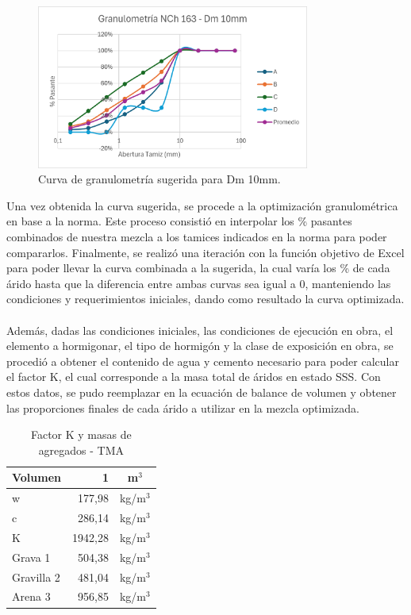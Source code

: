 \begin{figure}[H]
    \centering
    \includegraphics[width=0.8\textwidth]{GRAFICOS/NCh163.png}
    \caption{Curva de granulometría sugerida para Dm 10mm.}
\end{figure}

Una vez obtenida la curva sugerida, se procede a la optimización granulométrica en base a la norma. Este proceso consistió en interpolar los \% pasantes combinados de nuestra mezcla a los tamices indicados en la norma para poder compararlos. Finalmente, se realizó una iteración con la función objetivo de Excel para poder llevar la curva combinada a la sugerida, la cual varía los \% de cada árido hasta que la diferencia entre ambas curvas sea igual a 0, manteniendo las condiciones y requerimientos iniciales, dando como resultado la curva optimizada.
\\\\
Además, dadas las condiciones iniciales, las condiciones de ejecución en obra, el elemento a hormigonar, el tipo de hormigón y la clase de exposición en obra, se procedió a obtener el contenido de agua y cemento necesario para poder calcular el factor K, el cual corresponde a la masa total de áridos en estado SSS. Con estos datos, se pudo reemplazar en la ecuación de balance de volumen y obtener las proporciones finales de cada árido a utilizar en la mezcla optimizada.

\begin{table}[H]
\centering
\caption{Factor K y masas de agregados - TMA}
\label{tab:factor_k_tma}
\begin{tabular}{|l|r|c|}
\hline
\textbf{Volumen} & \textbf{1} & \textbf{m$^{3}$} \\ \hline
w          & 177,98     & kg/m$^{3}$ \\ \hline
c          & 286,14  & kg/m$^{3}$ \\ \hline
K          & 1942,28  & kg/m$^{3}$ \\ \hline
Grava 1    & 504,38  & kg/m$^{3}$ \\ \hline
Gravilla 2 & 481,04  & kg/m$^{3}$ \\ \hline
Arena 3    & 956,85  & kg/m$^{3}$ \\ \hline
\end{tabular}
\end{table}

